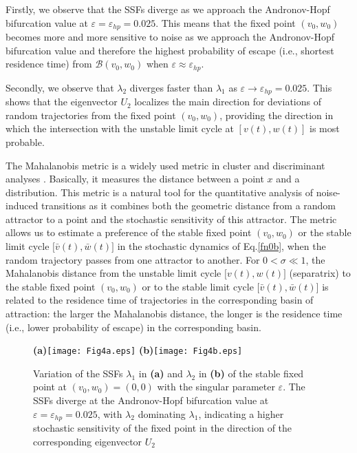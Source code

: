 Firstly, we
observe that the SSFs diverge as we approach the Andronov-Hopf
bifurcation value at $\varepsilon=\varepsilon_{hp}=0.025$. This means that the fixed point
$(v_0,w_0)$ becomes more and more sensitive to noise as we approach the
Andronov-Hopf bifurcation value and therefore the
highest probability of escape (i.e., shortest residence time) from $\mathcal{B}(v_0,w_0)$
when $\varepsilon\approx\varepsilon_{hp}$. 

Secondly, we observe that 
$\lambda_2$ diverges faster than $\lambda_1$ as $\varepsilon\rightarrow\varepsilon_{hp}=0.025$. This
shows that  the eigenvector $U_2$ localizes the main direction for
deviations of random trajectories from the fixed point
$(v_0,w_0)$, providing the direction in which the intersection
with the unstable limit cycle at $[v(t),w(t)]$ is most
probable. 

The Mahalanobis metric is a widely used metric in cluster and
discriminant analyses \cite{G. McLachlan}. Basically, it measures
the distance between a point $x$ and a distribution. This metric
is a natural tool for the quantitative analysis of noise-induced
transitions as it combines both the geometric distance from a
random attractor to a point and the stochastic sensitivity of this
attractor. The metric allows us to estimate a preference of the
stable fixed point $(v_0,w_0)$ or the stable limit cycle
$\big[\bar{v}(t),\bar{w}(t)\big]$ in the stochastic dynamics of
Eq.\eqref{fn0b}, when the random trajectory passes from one attractor
to another. For $0<\sigma\ll1$, the Mahalanobis distance from the
unstable limit cycle $\big[v(t),w(t)\big]$ (separatrix) to the
stable fixed point $(v_0,w_0)$ or to the stable limit cycle
$\big[\bar{v}(t),\bar{w}(t)\big]$ is related to the residence time
of trajectories in the corresponding basin of attraction: the
larger the Mahalanobis distance, the longer is the residence time
(i.e., lower probability of escape) in the corresponding basin.
\begin{figure}%
\begin{center}
\textbf{(a)}\texttt{[image: Fig4a.eps]}
\textbf{(b)}\texttt{[image: Fig4b.eps]}
\caption{Variation of the SSFs $\lambda_1$ in \textbf{(a)} and 
$\lambda_2$ in \textbf{(b)} of the stable fixed point at $(v_0,w_0)=(0,0)$ with 
the singular parameter $\varepsilon$. The SSFs diverge at
the Andronov-Hopf bifurcation value at
$\varepsilon=\varepsilon_{hp}=0.025$, with $\lambda_2$ 
dominating $\lambda_1$, indicating a higher stochastic sensitivity of the
fixed point in the direction of the corresponding
eigenvector $U_2$} \label{fig:chap33}
\end{center}
\end{figure}

